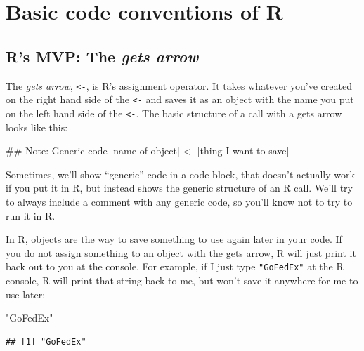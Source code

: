 \documentclass[]{book}
\makeatletter
\newenvironment{Shaded}{\begin{snugshade}}{\end{snugshade}}
\newcommand{\StringTok}[1]{\textcolor[rgb]{0.31,0.60,0.02}{#1}}
\newcommand{\NormalTok}[1]{#1}
\newenvironment{kframe}{%
\medskip{}
\setlength{\fboxsep}{.8em}
 \def\at@end@of@kframe{}%
 \ifinner\ifhmode%
  \def\at@end@of@kframe{\end{minipage}}%
  \begin{minipage}{\columnwidth}%
 \fi\fi%
 \def\FrameCommand##1{\hskip\@totalleftmargin \hskip-\fboxsep
 \colorbox{shadecolor}{##1}\hskip-\fboxsep
     \hskip-\linewidth \hskip-\@totalleftmargin \hskip\columnwidth}%
 \MakeFramed {\advance\hsize-\width
   \@totalleftmargin\z@ \linewidth\hsize
   \@setminipage}}%
 {\par\unskip\endMakeFramed%
 \at@end@of@kframe}
\renewenvironment{Shaded}{\begin{kframe}}{\end{kframe}}
\newenvironment{rmdblock}[1]
  {
  \begin{itemize}
  \renewcommand{\labelitemi}{
    \raisebox{-.7\height}[0pt][0pt]{
      {\setkeys{Gin}{width=3em,keepaspectratio}\texttt{[image: images/\#1]}}
    }
  }
  \setlength{\fboxsep}{1em}
  \begin{kframe}
  \item
  }
  {
  \end{kframe}
  \end{itemize}
  }
\newenvironment{rmdwarning}
  {\begin{rmdblock}{warning}}
  {\end{rmdblock}}
\theoremstyle{definition}
\theoremstyle{definition}
\theoremstyle{definition}
\theoremstyle{remark}
\makeatother
\begin{document}
\section{Basic code conventions of R}\label{basic-code-conventions-of-r}

\subsection{\texorpdfstring{R's MVP: The \emph{gets
arrow}}{R's MVP: The gets arrow}}\label{rs-mvp-the-gets-arrow}

The \emph{gets arrow}, \texttt{\textless{}-}, is R's assignment
operator. It takes whatever you've created on the right hand side of the
\texttt{\textless{}-} and saves it as an object with the name you put on
the left hand side of the \texttt{\textless{}-}. The basic structure of
a call with a gets arrow looks like this:

\begin{Shaded}
\begin{Highlighting}[]
\NormalTok{## Note: Generic code}
\NormalTok{[name of object] <-}\StringTok{ }\NormalTok{[thing I want to save]}
\end{Highlighting}
\end{Shaded}

\begin{rmdwarning}
Sometimes, we'll show ``generic'' code in a code block, that doesn't
actually work if you put it in R, but instead shows the generic
structure of an R call. We'll try to always include a comment with any
generic code, so you'll know not to try to run it in R.
\end{rmdwarning}

In R, objects are the way to save something to use again later in your
code. If you do not assign something to an object with the gets arrow, R
will just print it back out to you at the console. For example, if I
just type \texttt{"GoFedEx"} at the R console, R will print that string
back to me, but won't save it anywhere for me to use later:

\begin{Shaded}
\begin{Highlighting}[]
\StringTok{"GoFedEx"}
\end{Highlighting}
\end{Shaded}

\begin{verbatim}
## [1] "GoFedEx"
\end{verbatim}
\end{document}
